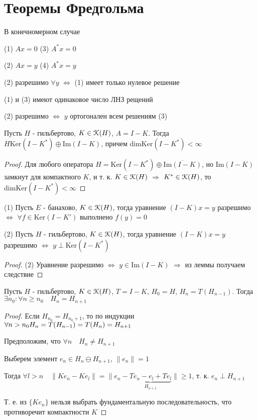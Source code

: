 \documentclass[a4paper,12pt]{report}
\begin{document}
\chapter{Теоремы Фредгольма}

В конечномерном случае 

(1) $Ax=0$ (3) $A^*x=0$

(2) $Ax=y$ (4) $A^*x=y$

(2) разрешимо $\forall y$ $\Leftrightarrow$ (1) имеет только нулевое решение

(1) и (3) имеют одинаковое число ЛНЗ рещений

(2) разрешимо $\Leftrightarrow$ $y$ ортогонален всем решениям (3)
 


\begin{lem}
Пусть $H$ - гильбертово, $K\in\EuScript K(H)$, $A=I-K$. Тогда $H\mathrm{Ker}(I-K^*)\oplus\mathrm{Im}(I-K)$, причем $\mathrm{dimKer}(I-K^*)<\infty$
\end{lem}
\begin{proof}
Для любого оператора $H=\mathrm{Ker}(I-K^*)\oplus\overline{\mathrm{Im}(I-K)}$, но $\mathrm{Im}(I-K)$ замкнут для компактного $K$, и т. к. $K\in\EuScript K(H)$ $\Rightarrow$ $K^*\in\EuScript K(H)$, то $\mathrm{dimKer}(I-K^*)<\infty$
\end{proof}
 


\begin{cons}
(1) Пусть $E$ - банахово, $K\in\EuScript K(H)$, тогда уравнение $(I-K)x=y$ разрешимо $\Leftrightarrow$ $\forall f\in\mathrm{Ker}(I-K')$ выполнено $f(y)=0$

(2) Пусть $H$ - гильбертово, $K\in\EuScript K(H)$, тогда уравнение $(I-K)x=y$ разрешимо $\Leftrightarrow$ $y\perp\mathrm{Ker}(I-K^*)$ 
\end{cons}
\begin{proof}
(2) Уравнение разрешимо $\Leftrightarrow$ $y\in\mathrm{Im}(I-K)$ $\Rightarrow$ из леммы получаем следствие
\end{proof}
 


\begin{lem}
Пусть $H$ - гильбертово, $K\in\EuScript K(H)$, $T=I-K$, $H_0=H$, $H_n=T(H_{n-1})$. Тогда $\exists n_0\colon\forall n\ge n_0\quad H_n=H_{n+1}$
\end{lem}
\begin{proof}
Если $H_{n_0}=H_{n_0+1}$, то по индукции $\forall n>n_0\quad\\ H_n=T(H_{n-1})=T(H_n)=H_{n+1}$

Предположим, что $\forall n\quad H_n\ne H_{n+1}$

Выберем элемент $e_n\in H_n\ominus H_{n+1}$, $\|e_n\|=1$

Тогда $\forall l>n\quad\|Ke_n-Ke_l\|=\|e_n-\underbrace{Te_n-e_l+Te_l}_{H_{n+1}}\|\ge1$, т. к. $e_n\perp H_{n+1}$

Т. е. из $\{Ke_n\}$ нельзя выбрать фундаментальную последовательность, что противоречит компактности $K$
\end{proof}
 
\end{document}
